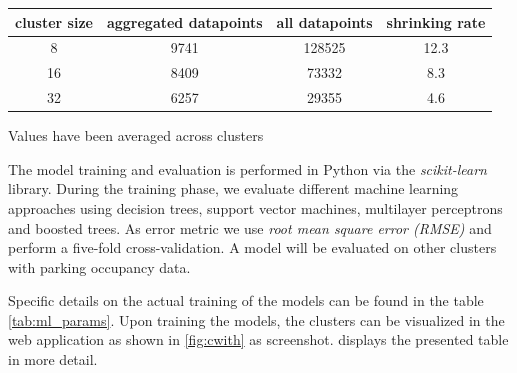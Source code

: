 \documentclass{ws-ijait}
\begin{document}
	\begin{table}[!ht]
		{\begin{tabular}{ | c | c | c | c | } %
				\hline
				{cluster size} & {aggregated datapoints} & {all datapoints} & {shrinking rate} \\ \hline
				8 &	9741 & 128525 &	12.3 \\ \hline
				16 & 8409 &	73332 &	8.3 \\ \hline
				32 & 6257 &	29355 &	4.6 \\ \hline
		\end{tabular}}
		\begin{tabnote}
			Values have been averaged across clusters
		\end{tabnote}
		\label{tab:models_training_points}
	\end{table}
	
	The model training and evaluation is performed in Python via the \textit{scikit-learn} library. During the training phase, we evaluate different machine learning approaches using decision trees, support vector machines, multilayer perceptrons and boosted trees. As error metric we use \textit{root mean square error (RMSE)} and perform a five-fold cross-validation. A model will be evaluated on other clusters with parking occupancy data.
	
	Specific details on the actual training of the models can be found in the table \cref{tab:ml_params}. Upon training the models, the clusters can be visualized in the web application as shown in \cref{fig:cwith} as screenshot.  displays the presented table in more detail.
	
\end{document}
